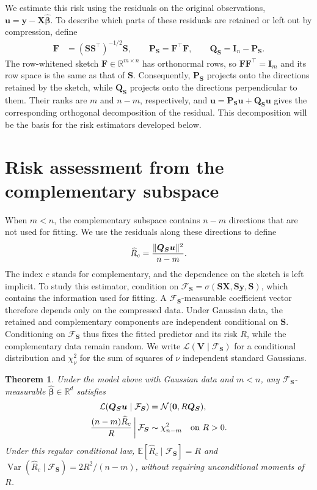 \documentclass{article}
\theoremstyle{plain}
\newtheorem{theorem}{Theorem}[section]
\theoremstyle{definition}
\theoremstyle{definition}
\newcommand{\boldzero}{\mathbf{0}}
\DeclarePairedDelimiter\norm{\lVert}{\rVert}
\def\R{{\mathbb{R}}}
\def\E{{\mathbb{E}}}
\def\mathbold{\boldsymbol}
\def\cal{\mathcal}
\def\bF{\mathbold{F}}\def\calF{{\cal F}}\def\scrF{{\mathscr F}}\def\Fhat{\widehat{F}}\def\Ftil{{\widetilde F}}
\def\bI{\mathbold{I}}\def\hbI{{\widehat{\bI}}}\def\tbI{{\widetilde{\bI}}}
\def\calN{{\cal N}}\def\scrN{{\mathscr N}}\def\Nhat{\widehat{N}}\def\Ntil{{\widetilde N}}\def\Nbar{{\overline N}}
\def\bP{\mathbold{P}}\def\hbP{{\widehat{\bP}}}\def\tbP{{\widetilde{\bP}}}
\def\bQ{\mathbold{Q}}\def\hbQ{{\widehat{\bQ}}}\def\tbQ{{\widetilde{\bQ}}}
\def\bS{\mathbold{S}}\def\hbS{{\widehat{\bS}}}\def\tbS{{\widetilde{\bS}}}
\def\bu{\mathbold{u}}\def\uhat{\widehat{u}}\def\util{\widetilde{u}}\def\ubar{{\overline u}}
\def\bV{\mathbold{V}}\def\hbV{{\widehat{\bV}}}\def\tbV{{\widetilde{\bV}}}
\def\bX{\mathbold{X}}\def\hbX{{\widehat{\bX}}}\def\tbX{{\tilde{\bX}}}\def\bXbar{{\overline \bX}}
\def\by{\mathbold{y}}\def\yhat{\widehat{y}}\def\ytil{\widetilde{y}}\def\ybar{{\overline y}}\def\vby{{\bf y}}
\def\bbeta{\mathbold{\beta}}\def\betahat{\widehat{\beta}}\def\hbeta{\widehat{\beta}}
\def\hbbeta{\hat{\bbeta}{}}
\begin{document}
We estimate this risk using the residuals on the original observations,
$\bu=\by-\bX\hbbeta$. To describe which parts of these residuals are
retained or left out by compression, define
\begin{align}
 \bF&=(\bS\bS^\top)^{-1/2}\bS,\qquad
 \bP_{\bS}=\bF^\top\bF,\qquad
 \bQ_{\bS}=\bI_n-\bP_{\bS}.
 \label{eq:cpal-observation-geometry}
\end{align}
The row-whitened sketch $\bF\in\R^{m\times n}$ has orthonormal rows, so
$\bF\bF^\top=\bI_m$ and its row space is the same as that of $\bS$.
Consequently, $\bP_{\bS}$ projects onto the directions retained by the
sketch, while $\bQ_{\bS}$ projects onto the directions perpendicular to
them. Their ranks are $m$ and $n-m$, respectively, and
$\bu=\bP_{\bS}\bu+\bQ_{\bS}\bu$ gives the corresponding orthogonal
decomposition of the residual. This decomposition will be the basis for
the risk estimators developed below. 




\section{Risk assessment from the complementary subspace}
\label{sec:cpal-complementary-assessment}

When $m<n$, the complementary subspace contains $n-m$ directions that are not used for fitting. We use the residuals along these directions to define
\begin{align*}
 \widehat R_c=\frac{\norm{\bQ_{\bS}\bu}^2}{n-m}.
\end{align*}
The index $c$ stands for complementary, and the dependence on the sketch is left implicit. To study this estimator, condition on
$\calF_{\bS}=\sigma(\bS\bX,\bS\by,\bS)$, which contains the information used for fitting. A $\calF_{\bS}$-measurable coefficient vector therefore depends only on the compressed data. Under Gaussian data, the retained and complementary components are independent conditional on $\bS$. Conditioning on $\calF_{\bS}$ thus fixes the fitted predictor and its risk $R$, while the complementary data remain random. We write $\mathcal L(\bV\mid\calF_{\bS})$ for a conditional distribution and $\chi^2_\nu$ for the sum of squares of $\nu$ independent standard Gaussians.

\begin{theorem}
\label{thm:cpal-complementary-law}
\label{thm:complementary-validation}
Under the model above with Gaussian data and $m<n$, any
$\calF_{\bS}$-measurable $\hbbeta\in\R^d$ satisfies
\begin{align}
 \mathcal L(\bQ_{\bS}\bu\mid\calF_{\bS})
 &=\calN(\boldzero,R\bQ_{\bS}),\notag\\
 \frac{(n-m)\widehat R_c}{R}\,\bigg|\,\calF_{\bS}
 &\sim\chi^2_{n-m}\quad\text{on }R>0.
 \label{eq:cpal-complementary-law}
\end{align}
Under this regular conditional law,
$\E[\widehat R_c\mid\calF_{\bS}]=R$ and
$\operatorname{Var}(\widehat R_c\mid\calF_{\bS})=2R^2/(n-m)$,
without requiring unconditional moments of $R$.
\end{theorem}
\end{document}
